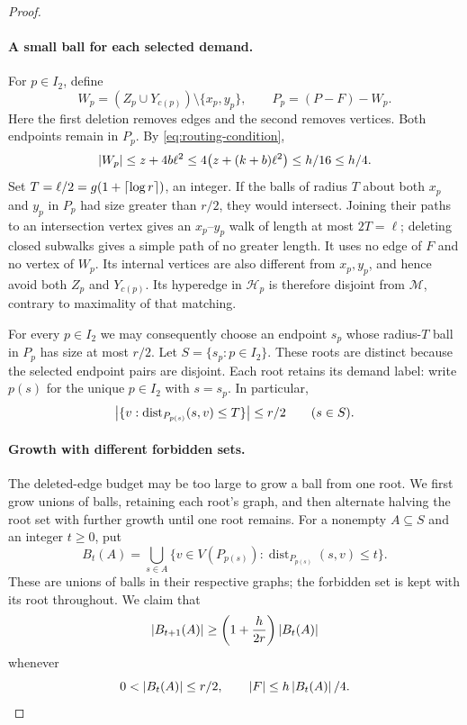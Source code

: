 \begin{proof}
\paragraph{A small ball for each selected demand.}
For $p\in I_2$, define
\[
  W_p=(Z_p\cup Y_{c(p)})\setminus\{x_p,y_p\},\qquad
  P_p=(P-F)-W_p.
\]
Here the first deletion removes edges and the second removes vertices.
Both endpoints remain in $P_p$.  By \eqref{eq:routing-condition},
\begin{equation}\label{eq:routing-forbidden-budget}
  \left|W_p\right|\le z+4b\ell^2
  \le 4\bigl(z+(k+b)\ell^2\bigr)
  \le h/16\le h/4.
\end{equation}
Set $T=\ell/2=g(1+\left\lceil\log r\right\rceil)$, an integer.  If the balls of
radius $T$ about both $x_p$ and $y_p$ in $P_p$ had size greater than
$r/2$, they would intersect.  Joining their paths to an intersection
vertex gives an $x_p$--$y_p$ walk of length at most $2T=\ell$; deleting
closed subwalks gives a simple path of no greater length.  It uses no
edge of $F$ and no vertex of $W_p$.  Its internal vertices are also
different from $x_p,y_p$, and hence avoid both $Z_p$ and $Y_{c(p)}$.
Its hyperedge in $\mathcal H_p$ is therefore disjoint from $\mathcal M$,
contrary to maximality of that matching.

For every $p\in I_2$ we may consequently choose an endpoint $s_p$ whose
radius-$T$ ball in $P_p$ has size at most $r/2$.  Let
$S=\{s_p:p\in I_2\}$.  These roots are distinct because the selected
endpoint pairs are disjoint.  Each root retains its demand label: write
$p(s)$ for the unique $p\in I_2$ with $s=s_p$.  In particular,
\begin{equation}\label{eq:routing-small-root-balls}
  \left|\{v:\operatorname{dist}_{P_{p(s)}}(s,v)\le T\}\right|\le r/2
  \qquad(s\in S).
\end{equation}

\paragraph{Growth with different forbidden sets.}
The deleted-edge budget may be too large to grow a ball from one root.
We first grow unions of balls, retaining each root's graph, and then
alternate halving the root set with further growth until one root remains.
For a nonempty $A\subseteq S$ and an integer $t\ge 0$, put
\[
  B_t(A)=\bigcup_{s\in A}
  \{v\in V(P_{p(s)}):\operatorname{dist}_{P_{p(s)}}(s,v)\le t\}.
\]
These are unions of balls in their respective graphs; the forbidden set
is kept with its root throughout.  We claim that
\begin{equation}\label{eq:routing-union-growth}
  \left|B_{t+1}(A)\right|
  \ge\left(1+\frac{h}{2r}\right)\left|B_t(A)\right|
\end{equation}
whenever
\begin{equation}\label{eq:routing-growth-threshold}
  0<\left|B_t(A)\right|\le r/2,
  \qquad \left|F\right|\le h\left|B_t(A)\right|/4.
\end{equation}


\end{proof}
